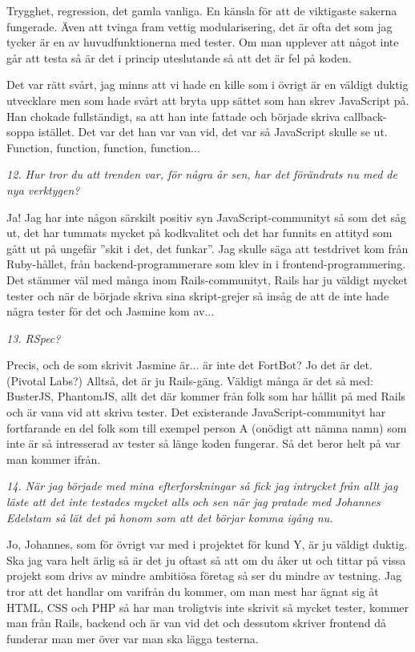 \documentclass[11pt]{article}
\begin{document}
Trygghet, regression, det gamla vanliga. En känsla för att de viktigaste sakerna fungerade. Även att tvinga fram vettig modularisering, det är ofta det som jag tycker är en av huvudfunktionerna med tester. Om man upplever att något inte går att testa så är det i princip uteslutande så att det är fel på koden.

Det var rätt svårt, jag minns att vi hade en kille som i övrigt är en väldigt duktig utvecklare men som hade svårt att bryta upp sättet som han skrev JavaScript på. Han chokade fullständigt, sa att han inte fattade och började skriva callback-soppa istället. Det var det han var van vid, det var så JavaScript skulle se ut. Function, function, function, function...

\emph{12. Hur tror du att trenden var, för några år sen, har det förändrats nu med de nya verktygen?}

Ja! Jag har inte någon särskilt positiv syn JavaScript-communityt så som det såg ut, det har tummats mycket på kodkvalitet och det har funnits en attityd som gått ut på ungefär ”skit i det, det funkar”. Jag skulle säga att testdrivet kom från Ruby-hållet, från backend-programmerare som klev in i frontend-programmering. Det stämmer väl med många inom Rails-communityt, Rails har ju väldigt mycket tester och när de började skriva sina skript-grejer så insåg de att de inte hade några tester för det och Jasmine kom av...

\emph{13. RSpec?}

Precis, och de som skrivit Jasmine är... är inte det FortBot? Jo det är det. (Pivotal Labs?) Alltså, det är ju Rails-gäng. Väldigt många är det så med: BusterJS, PhantomJS, allt det där kommer från folk som har hållit på med Rails och är vana vid att skriva tester. Det existerande JavaScript-communityt har fortfarande en del folk som till exempel person A (onödigt att nämna namn) som inte är så intresserad av tester så länge koden fungerar. Så det beror helt på var man kommer ifrån.

\emph{14. När jag började med mina efterforskningar så fick jag intrycket från allt jag läste att det inte testades mycket alls och sen när jag pratade med Johannes Edelstam så lät det på honom som att det börjar komma igång nu.}

Jo, Johannes, som för övrigt var med i projektet för kund Y, är ju väldigt duktig. Ska jag vara helt ärlig så är det ju oftast så att om du åker ut och tittar på vissa projekt som drivs av mindre ambitiösa företag så ser du mindre av testning. Jag tror att det handlar om varifrån du kommer, om man mest har ägnat sig åt HTML, CSS och PHP så har man troligtvis inte skrivit så mycket tester, kommer man från Rails, backend och är van vid det och dessutom skriver frontend då funderar man mer över var man ska lägga testerna.
\end{document}
